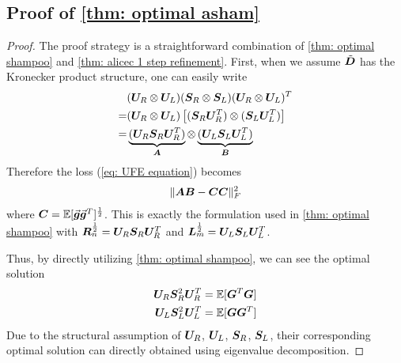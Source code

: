 \subsection{Proof of \cref{thm: optimal asham}}
\label{subapp: proof asham}

\begin{proof}
    The proof strategy is a straightforward combination of \cref{thm: optimal shampoo} and \cref{thm: alicec 1 step refinement}. First, when we assume $\tilde{{\bm{D}}}$ has the Kronecker product structure, one can easily write 
    \begin{align*}
        &({\bm{U}}_R\otimes {\bm{U}}_L)({\bm{S}}_R\otimes {\bm{S}}_L)({\bm{U}}_R\otimes {\bm{U}}_L)^T\\
        =& ({\bm{U}}_R\otimes {\bm{U}}_L)\left[({\bm{S}}_R{\bm{U}}_R^T)\otimes ({\bm{S}}_L{\bm{U}}_L^T)\right]\\
        =& \underbrace{({\bm{U}}_R{\bm{S}}_R{\bm{U}}_R^T)}_{{\bm{A}}}\otimes \underbrace{({\bm{U}}_L{\bm{S}}_L{\bm{U}}_L^T)}_{{\bm{B}}}
    \end{align*}
    Therefore the loss (\cref{eq: UFE equation}) becomes
    \begin{align*}
        \Vert{\bm{A}}{\bm{B}}-{\bm{C}}{\bm{C}}\Vert_F^2
    \end{align*}
    where ${\bm{C}} = \mathbb{E}[\vec{\bm{g}}\vec{\bm{g}}^T]^{\frac{1}{2}}$. 
    This is exactly the formulation used in \cref{thm: optimal shampoo} with ${\bm{R}}_n^{\frac{1}{2}} = {\bm{U}}_R{\bm{S}}_R{\bm{U}}_R^T$ and ${\bm{L}}_m^{\frac{1}{2}} = {\bm{U}}_L{\bm{S}}_L{\bm{U}}_L^T$. 

    Thus, by directly utilizing \cref{thm: optimal shampoo}, we can see the optimal solution
    \begin{align*}
        {\bm{U}}_R{\bm{S}}_R^2{\bm{U}}_R^T &= \mathbb{E}[{\bm{G}}^T{\bm{G}}]\\
        {\bm{U}}_L{\bm{S}}_L^2{\bm{U}}_L^T &= \mathbb{E}[{\bm{G}}{\bm{G}}^T]
    \end{align*}
    Due to the structural assumption of ${\bm{U}}_R$, ${\bm{U}}_L$, ${\bm{S}}_R$, ${\bm{S}}_L$, their corresponding optimal solution can directly obtained using eigenvalue decomposition. 


\end{proof}
